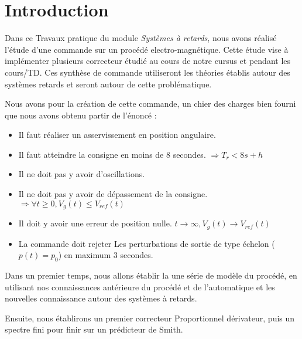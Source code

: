 \chapter*{Introduction}
\label{chap:Intro}
Dans ce Travaux pratique du module \emph{Systèmes à retards}, nous avons réalisé l'étude d'une commande sur un procédé electro-magnétique. Cette étude vise à implémenter plusieurs correcteur étudié au cours de notre cursus et pendant les cours/TD. Ces synthèse de commande utiliseront les théories établis autour des systèmes  retards et seront autour de cette problématique.

Nous avons pour la création de cette commande, un chier des charges bien fourni que nous avons obtenu  partir de l'énoncé :
\begin{itemize}
\item Il faut réaliser un asservissement en position angulaire.
\item Il faut atteindre la consigne en moins de 8 secondes. $\Rightarrow T_r<8s + h $
\item Il ne doit pas y avoir d'oscillations.
\item Il ne doit pas y avoir de dépassement de la consigne.$\Rightarrow \forall t \geq 0, V_g(t)\leq V_{ref}(t)$
\item Il doit y avoir une erreur de position nulle. $ t\rightarrow \infty, V_g(t) \rightarrow V_{ref}(t)$
\item La commande doit rejeter Les perturbations de sortie de type échelon ($p(t)=p_0$) en maximum 3 secondes.
\end{itemize}

Dans un premier temps, nous allons établir la une série de modèle du procédé, en utilisant nos connaissances antérieure du procédé et de l'automatique et les nouvelles connaissance autour des systèmes à retards.


Ensuite, nous établirons un premier correcteur Proportionnel dérivateur, puis un spectre fini pour finir sur un prédicteur de Smith.